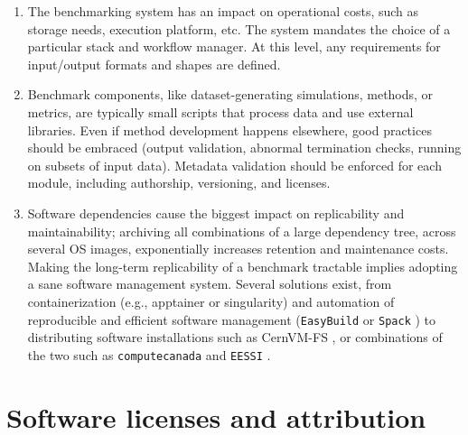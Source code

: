 \documentclass[11pt]{article}
\begin{document}
\begin{enumerate}
\item The benchmarking system has an impact on operational costs, such as storage needs, execution platform, etc.  The system mandates the choice of a particular stack and workflow manager. At this level, any requirements for input/output formats and shapes are defined.

\item Benchmark components, like dataset-generating simulations, methods, or metrics, are typically small scripts that process data and use external libraries. Even if method development happens elsewhere, good practices should be embraced (output validation, abnormal termination checks, running on subsets of input data).  Metadata validation should be enforced for each module, including authorship, versioning, and licenses.

\item Software dependencies cause the biggest impact on replicability and maintainability; archiving all combinations of a large dependency tree, across several OS images, exponentially increases retention and maintenance costs. Making the long-term replicability of a benchmark tractable implies adopting a sane software management system. Several solutions exist, from containerization (e.g., apptainer or singularity) \cite{Kurtzer2017-mn} and automation of reproducible and efficient software management (\texttt{EasyBuild} \cite{Hoste2012-gg} or \texttt{Spack} \cite{Gamblin2015-ll}) to distributing software installations such as CernVM-FS \cite{Blomer2013-jk},  or combinations of the two such as \texttt{computecanada} \cite{Boissonneault2019-wm} and \texttt{EESSI} \cite{Droge2023-ax}.

\end{enumerate}

\section*{Software licenses and attribution}
\end{document}
